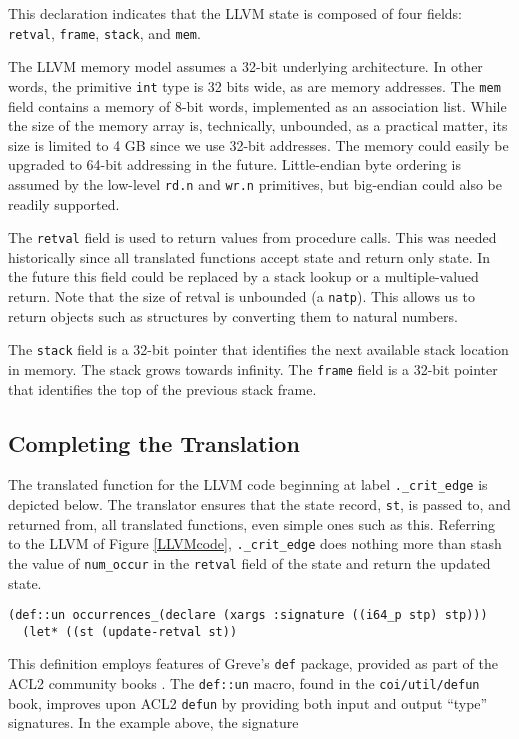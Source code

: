 \documentclass{eptcs}
\begin{document}
This declaration indicates that the LLVM state is composed of four
fields: \texttt{retval}, \texttt{frame}, \texttt{stack}, and
\texttt{mem}.

The LLVM memory model assumes a 32-bit underlying architecture.  In
other words, the primitive \texttt{int} type is 32 bits wide, as are
memory addresses.  The \texttt{mem} field contains a memory 
of 8-bit words, implemented as an association list.  While the size of
the memory array is, technically,
unbounded, as a practical matter, its size is limited to 4 GB since we
use 32-bit addresses.  The memory could easily be upgraded to 64-bit
addressing in the future.  Little-endian byte ordering is assumed by
the low-level \texttt{rd.n} and \texttt{wr.n} primitives, but
big-endian could also be readily supported.
 
The \texttt{retval} field is used to return values from procedure
calls.  This was needed historically since all translated functions
accept state and return only state.  In the future this field could 
be replaced by a stack lookup or a multiple-valued return.  Note that the size of
retval is unbounded (a \texttt{natp}).  This allows us to return
objects such as structures by converting them to natural numbers.

The \texttt{stack} field is a 32-bit pointer that identifies the next
available stack location in memory.  The stack grows towards infinity.
The \texttt{frame} field is a 32-bit pointer that identifies the top
of the previous stack frame.

\subsection{Completing the Translation}

The translated function for the LLVM code beginning at label
\texttt{.\_crit\_edge} is depicted below.  The
translator ensures that the state record, \texttt{st}, is passed to,
and returned from, all translated functions, even simple ones such as
this.  Referring to the LLVM of Figure \ref{LLVMcode},
\texttt{.\_crit\_edge} does nothing more than stash the value of
\texttt{num\_occur} in the \texttt{retval} field of the state and
return the updated state.

\begin{verbatim}
(def::un occurrences_(declare (xargs :signature ((i64_p stp) stp)))
  (let* ((st (update-retval st))
\end{verbatim}

This definition employs features of Greve's \texttt{def} package,
provided as part of the ACL2 community books \cite{assumeterm} \cite{defung}.
The \texttt{def::un} macro, found in the \texttt{coi/util/defun} book, improves
upon ACL2 \texttt{defun} by providing both input and output ``type''
signatures.  In the example above, the signature
\end{document}
